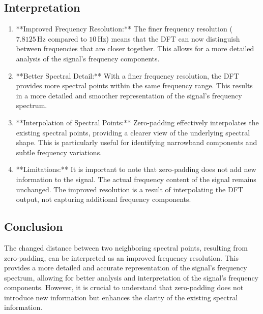 \subsection*{Interpretation}
\begin{enumerate}
    \item **Improved Frequency Resolution:**
    The finer frequency resolution (\( 7.8125 \, \text{Hz} \) compared to \( 10 \, \text{Hz} \)) means that the DFT can now distinguish between frequencies that are closer together. This allows for a more detailed analysis of the signal's frequency components.

    \item **Better Spectral Detail:**
    With a finer frequency resolution, the DFT provides more spectral points within the same frequency range. This results in a more detailed and smoother representation of the signal's frequency spectrum.

    \item **Interpolation of Spectral Points:**
    Zero-padding effectively interpolates the existing spectral points, providing a clearer view of the underlying spectral shape. This is particularly useful for identifying narrowband components and subtle frequency variations.

    \item **Limitations:**
    It is important to note that zero-padding does not add new information to the signal. The actual frequency content of the signal remains unchanged. The improved resolution is a result of interpolating the DFT output, not capturing additional frequency components.
\end{enumerate}

\subsection*{Conclusion}
The changed distance between two neighboring spectral points, resulting from zero-padding, can be interpreted as an improved frequency resolution. This provides a more detailed and accurate representation of the signal's frequency spectrum, allowing for better analysis and interpretation of the signal's frequency components. However, it is crucial to understand that zero-padding does not introduce new information but enhances the clarity of the existing spectral information.
